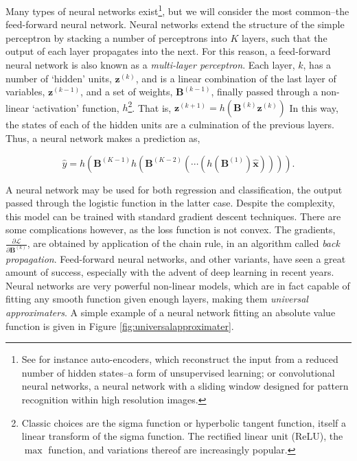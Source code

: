 \documentclass[11pt]{amsart}
\begin{document}
Many types of neural networks exist\footnote{See for instance auto-encoders, which reconstruct the input from a reduced number of hidden states--a form of unsupervised learning; or convolutional neural networks, a neural network with a sliding window designed for pattern recognition within high resolution images.}, but we will consider the most common--the feed-forward neural network. Neural networks extend the structure of the simple perceptron by stacking a number of perceptrons into $K$ layers, such that the output of each layer propagates into the next. For this reason, a feed-forward neural network is also known as a \emph{multi-layer perceptron}. Each layer, $k$, has a number of `hidden' units, $\mathbf{z}^{(k)}$, and is a linear combination of the last layer of variables, $\mathbf{z}^{(k-1)}$, and a set of weights, $\mathbf{B}^{(k-1)}$, finally passed through a non-linear `activation' function, $h$\footnote{Classic choices are the sigma function or hyperbolic tangent function, itself a linear transform of the sigma function. The rectified linear unit (ReLU), the $\max$ function, and variations thereof are increasingly popular.}. That is, $\mathbf{z}^{(k+1)} = h(\mathbf{B}^{(k)}\mathbf{z}^{(k)})$ In this way, the states of each of the hidden units are a culmination of the previous layers. Thus, a neural network makes a prediction as,

$$\hat{y} = h(\mathbf{B}^{(K-1)}h(\mathbf{B}^{(K-2)}(\cdots(h(\mathbf{B}^{(1)})\hat{\mathbf{x}})))).$$

A neural network may be used for both regression and classification, the output passed through the logistic function in the latter case. Despite the complexity, this model can be trained with standard gradient descent techniques. There are some complications however, as the loss function is not convex. The gradients, $\frac{\partial\mathcal{L}}{\partial\mathbf{B}^{(k)}}$, are obtained by application of the chain rule, in an algorithm called \emph{back propagation}. Feed-forward neural networks, and other variants, have seen a great amount of success, especially with the advent of deep learning in recent years. Neural networks are very powerful non-linear models, which are in fact capable of fitting any smooth function given enough layers, making them \emph{universal approximaters}. A simple example of a neural network fitting an absolute value function is given in Figure \ref{fig:universalapproximater}.
\end{document}
